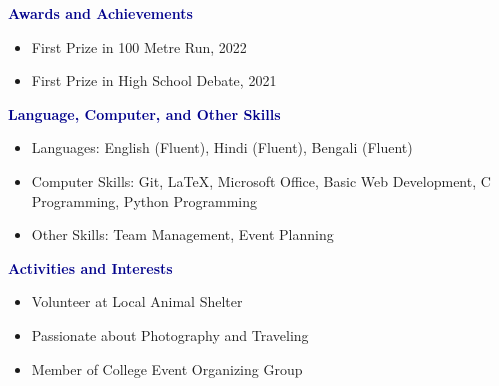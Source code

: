 \documentclass[a4paper,10pt]{article}
\newcommand{\sectionbreak}{\vspace{1em}}
\begin{document}
\sectionbreak
\sectionbreak

\textcolor{darkblue}{\textbf{\large Awards and Achievements}} \\
\begin{itemize}[leftmargin=*]
    \item First Prize in 100 Metre Run, 2022
    \item First Prize in High School Debate, 2021
\end{itemize}

\sectionbreak

\textcolor{darkblue}{\textbf{\large Language, Computer, and Other Skills}} \\
\begin{itemize}[leftmargin=*]
    \item Languages: English (Fluent), Hindi (Fluent), Bengali (Fluent)
    \item Computer Skills: Git, LaTeX, Microsoft Office, Basic Web Development, C Programming, Python Programming
    \item Other Skills: Team Management, Event Planning
\end{itemize}

\sectionbreak

\textcolor{darkblue}{\textbf{\large Activities and Interests}} \\
\begin{itemize}[leftmargin=*]
    \item Volunteer at Local Animal Shelter
    \item Passionate about Photography and Traveling
    \item Member of College Event Organizing Group
\end{itemize}
\end{document}
